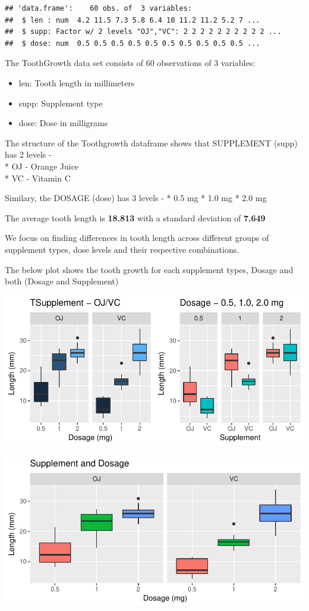 \documentclass[]{article}
\providecommand{\tightlist}{%
  \setlength{\itemsep}{0pt}\setlength{\parskip}{0pt}}
\begin{document}
\begin{verbatim}
## 'data.frame':    60 obs. of  3 variables:
##  $ len : num  4.2 11.5 7.3 5.8 6.4 10 11.2 11.2 5.2 7 ...
##  $ supp: Factor w/ 2 levels "OJ","VC": 2 2 2 2 2 2 2 2 2 2 ...
##  $ dose: num  0.5 0.5 0.5 0.5 0.5 0.5 0.5 0.5 0.5 0.5 ...
\end{verbatim}

The ToothGrowth data set consists of 60 observations of 3 variables:

\begin{itemize}
\tightlist
\item
  len: Tooth length in millimeters
\item
  supp: Supplement type
\item
  dose: Dose in milligrams
\end{itemize}

The structure of the Toothgrowth dataframe shows that SUPPLEMENT (supp)
has 2 levels -\\
* OJ - Orange Juice\\
* VC - Vitamin C

Similary, the DOSAGE (dose) has 3 levels - * 0.5 mg * 1.0 mg * 2.0 mg

The average tooth length is \textbf{18.813} with a standard deviation of
\textbf{7.649}

We focus on finding differences in tooth length across different groups
of supplement types, dose levels and their respective combinations.

The below plot shows the tooth growth for each supplement types, Dosage
and both (Dosage and Supplement)

\includegraphics{Statistical_Inference_Project_2_files/figure-latex/unnamed-chunk-3-1.pdf}

\includegraphics{Statistical_Inference_Project_2_files/figure-latex/unnamed-chunk-4-1.pdf}
\end{document}
